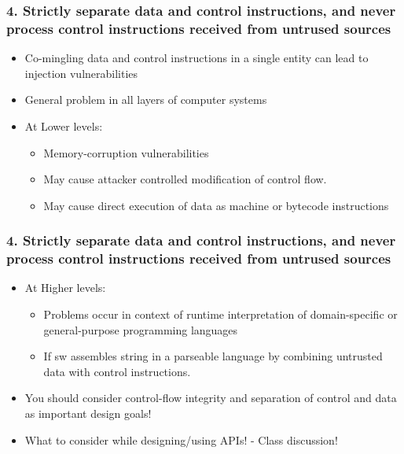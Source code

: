 \documentclass[12pt,norsk]{beamer}
\begin{document}
\begin{frame}

	\frametitle{4. Strictly separate data and control instructions, and never process control instructions received from untrused sources}
	
	\begin{itemize}
	
		\item Co-mingling data and control instructions in a single entity can lead to injection vulnerabilities
		\item General problem in all layers of computer systems
		\item At Lower levels:
	
		\begin{itemize}
			\item Memory-corruption vulnerabilities
			\item May cause attacker controlled modification of control flow.
			\item May cause direct execution of data as machine or bytecode instructions
		
		\end{itemize}
	
	\end{itemize}

\end{frame}
\begin{frame}
	\frametitle{4. Strictly separate data and control instructions, and never process control instructions received from untrused sources}
	
	\begin{itemize}
	
		\item At Higher levels:
		\begin{itemize}
			\item Problems occur in context of runtime interpretation of domain-specific or general-purpose programming languages
			\item If sw assembles string in a parseable language by combining untrusted data with control instructions.
		\end{itemize}
	
		\item You should consider control-flow integrity and separation of control and data as important design goals!
		\item What to consider while designing/using APIs! - Class discussion!
		 
	\end{itemize}

\end{frame}
\end{document}
